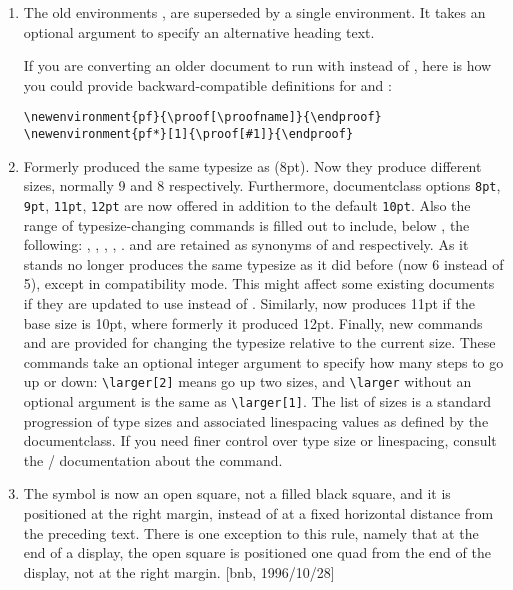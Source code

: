 \documentclass{amsdtx}
\begin{document}
\begin{enumerate}
\item The old environments ,  are superseded by a
single  environment. It takes an optional argument to specify
an alternative heading text.

If you are converting an older document to run with 
instead of , here is how you could provide
backward-compatible definitions for  and :
\begin{verbatim}
\newenvironment{pf}{\proof[\proofname]}{\endproof}
\newenvironment{pf*}[1]{\proof[#1]}{\endproof}
\end{verbatim}

\item Formerly  produced the same typesize as
 (8pt). Now they produce different sizes, normally 9
and 8 respectively. Furthermore, documentclass options \verb'8pt',
\verb'9pt', \verb'11pt', \verb'12pt' are now offered in addition to the
default \verb'10pt'. Also the range of typesize-changing commands is
filled out to include, below , the following: ,
, , , .  and
 are retained as synonyms of  and 
respectively. As it stands  no longer produces the same
typesize as it did before (now 6 instead of 5), except in compatibility
mode. This might affect some existing documents if they are updated to
use  instead of . Similarly,
 now produces 11pt if the base size is 10pt, where formerly it
produced 12pt. Finally, new commands  and  are
provided for changing the typesize relative to the current size. These
commands take an optional integer argument to specify how many steps to
go up or down: \verb'\larger[2]' means go up two sizes, and
\verb'\larger' without an optional argument is the same as
\verb'\larger[1]'. The list of sizes is a standard progression of type
sizes and associated linespacing values as defined by the documentclass.
If you need finer control over type size or linespacing, consult the
\latex/ documentation about the  command.

\item The  symbol is now an open square, not a filled black
square, and it is positioned at the right margin, instead of at a fixed
horizontal distance from the preceding text.  There is one exception to
this rule, namely that at the end of a display, the open square is
positioned one quad from the end of the display, not at the right margin.
[bnb, 1996/10/28]


\end{enumerate}
\end{document}
